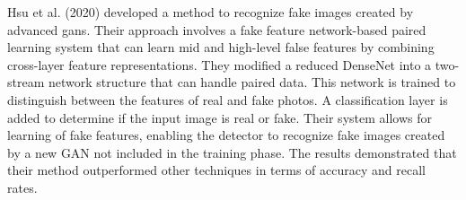 Hsu et al. (2020) \cite{hung2021multi} developed a method to recognize fake images created by advanced \acrshort{gans}. Their approach involves a fake feature network-based paired learning system that can learn mid and high-level false features by combining cross-layer feature representations. They modified a reduced DenseNet into a two-stream network structure that can handle paired data. This network is trained to distinguish between the features of real and fake photos. A classification layer is added to determine if the input image is real or fake. Their system allows for learning of fake features, enabling the detector to recognize fake images created by a new GAN not included in the training phase. The results demonstrated that their method outperformed other techniques in terms of accuracy and recall rates.

 

